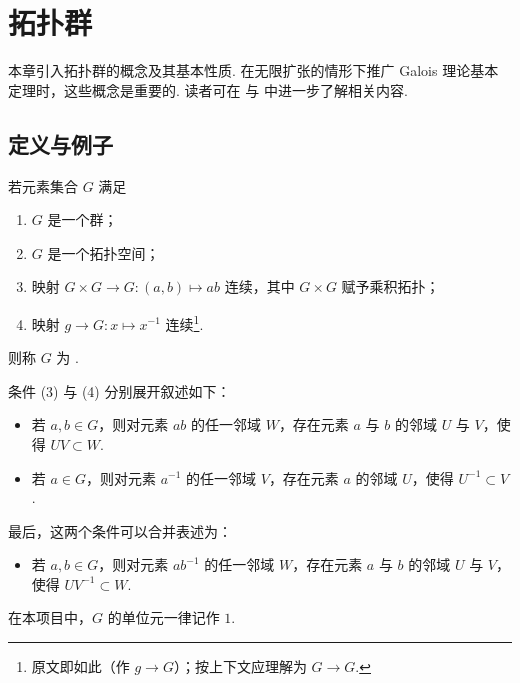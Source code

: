 
\chapter{拓扑群}
\label{ch:1}

本章引入拓扑群的概念及其基本性质. 在无限扩张的情形下推广 Galois 理论基本定理时，这些概念是重要的. 读者可在 \cite{pon66} 与 \cite{hus66} 中进一步了解相关内容.

\section{定义与例子}

\begin{definition}\label{c1-def-1-1}
若元素集合 $G$ 满足
\begin{enumerate}[label=(\arabic*),leftmargin=*]
    \item $G$ 是一个群；
    \item $G$ 是一个拓扑空间；
    \item 映射 $G\times G\to G:(a,b)\mapsto ab$ 连续，其中 $G\times G$ 赋予乘积拓扑；
    \item 映射 $g\to G:x\mapsto x^{-1}$ 连续\footnote{原文即如此（作 $g\to G$）；按上下文应理解为 $G\to G$.}.
\end{enumerate}
则称 $G$ 为 .
\end{definition}

条件 (3) 与 (4) 分别展开叙述如下：
\begin{itemize}
    \item 若 $a,b\in G$，则对元素 $ab$ 的任一邻域 $W$，存在元素 $a$ 与 $b$ 的邻域 $U$ 与 $V$，使得 $UV\subset W$.
    \item 若 $a\in G$，则对元素 $a^{-1}$ 的任一邻域 $V$，存在元素 $a$ 的邻域 $U$，使得 $U^{-1}\subset V$.
\end{itemize}
最后，这两个条件可以合并表述为：
\begin{itemize}
    \item 若 $a,b\in G$，则对元素 $ab^{-1}$ 的任一邻域 $W$，存在元素 $a$ 与 $b$ 的邻域 $U$ 与 $V$，使得 $UV^{-1}\subset W$.
\end{itemize}

\begin{notation}\label{c1-not-1-2}
在本项目中，$G$ 的单位元一律记作 $1$.
\end{notation}

